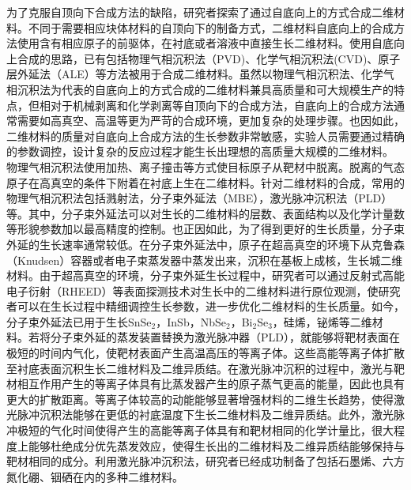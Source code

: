     为了克服自顶向下合成方法的缺陷，研究者探索了通过自底向上的方式合成二维材料。不同于需要相应块体材料的自顶向下的制备方式，二维材料自底向上的合成方法使用含有相应原子的前驱体，在衬底或者溶液中直接生长二维材料。使用自底向上合成的思路，已有包括物理气相沉积法（PVD)、化学气相沉积法(CVD)、原子层外延法（ALE）等方法被用于合成二维材料。虽然以物理气相沉积法、化学气相沉积法为代表的自底向上的方式合成的二维材料兼具高质量和可大规模生产的特点，但相对于机械剥离和化学剥离等自顶向下的合成方法，自底向上的合成方法通常需要如高真空、高温等更为严苛的合成环境，更加复杂的处理步骤。也因如此，二维材料的质量对自底向上合成方法的生长参数非常敏感，实验人员需要通过精确的参数调控，设计复杂的反应过程才能生长出理想的高质量大规模的二维材料。
    物理气相沉积法使用加热、离子撞击等方式使目标原子从靶材中脱离。脱离的气态原子在高真空的条件下附着在衬底上生在二维材料。针对二维材料的合成，常用的物理气相沉积法包括溅射法，分子束外延法（MBE），激光脉冲沉积法（PLD）等。其中，分子束外延法可以对生长的二维材料的层数、表面结构以及化学计量数等形貌参数加以最高精度的控制。也正因如此，为了得到更好的生长质量，分子束外延的生长速率通常较低。在分子束外延法中，原子在超高真空的环境下从克鲁森（Knudsen）容器或者电子束蒸发器中蒸发出来，沉积在基板上成核，生长城二维材料。由于超高真空的环境，分子束外延生长过程中，研究者可以通过反射式高能电子衍射（RHEED）等表面探测技术对生长中的二维材料进行原位观测，使研究者可以在生长过程中精细调控生长参数，进一步优化二维材料的生长质量。如今，分子束外延法已用于生长SnSe$_2$，InSb，NbSe$_2$，Bi$_2$Se$_3$，硅烯，铋烯等二维材料。若将分子束外延的蒸发装置替换为激光脉冲器（PLD），就能够将靶材表面在极短的时间内气化，使靶材表面产生高温高压的等离子体。这些高能等离子体扩散至衬底表面沉积生长二维材料及二维异质结。在激光脉冲沉积的过程中，激光与靶材相互作用产生的等离子体具有比蒸发器产生的原子蒸气更高的能量，因此也具有更大的扩散距离。等离子体较高的动能能够显著增强材料的二维生长趋势，使得激光脉冲沉积法能够在更低的衬底温度下生长二维材料及二维异质结。此外，激光脉冲极短的气化时间使得产生的高能等离子体具有和靶材相同的化学计量比，很大程度上能够杜绝成分优先蒸发效应，使得生长出的二维材料及二维异质结能够保持与靶材相同的成分。利用激光脉冲沉积法，研究者已经成功制备了包括石墨烯、六方氮化硼、铟硒在内的多种二维材料。%

